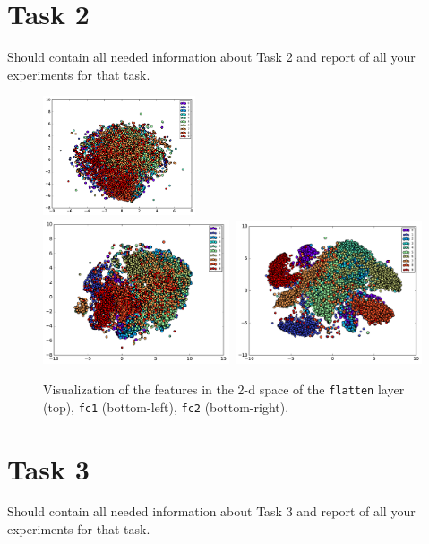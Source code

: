 \documentclass{article}
\begin{document}
\section{Task 2}
Should contain all needed information about Task 2 and report of all your experiments for that task.



\begin{figure}[h!]
\centering
\includegraphics[width=0.4\textwidth]{visualization-linear-features_flatten.pdf}\\	
\includegraphics[width=0.49\textwidth]{visualization-linear-features_fc1.pdf}\	
\includegraphics[width=0.49\textwidth]{visualization-linear-features_fc2.pdf}
\caption{Visualization of the features in the 2-d space of the \texttt{flatten} layer (top), \texttt{fc1} (bottom-left), \texttt{fc2} (bottom-right).}
\label{fig:5}
\end{figure}

\section{Task 3}
Should contain all needed information about Task 3 and report of all your experiments for that task.
\end{document}
